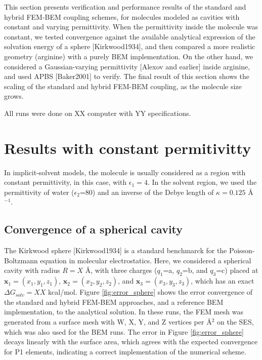 This section presents verification and performance results of the standard and hybrid FEM-BEM coupling schemes, for molecules modeled as cavities with constant and varying permittivity.
When the permittivity inside the molecule was constant, we tested convergence against the available analytical expression of the solvation energy of a sphere [Kirkwood1934], and then compared a more realistic geometry (arginine) with a purely BEM implementation.
On the other hand, we considered a Gaussian-varying permittivity [Alexov and earlier] inside arginine, and used APBS [Baker2001] to verify.
The final result of this section shows the scaling of the standard and hybrid FEM-BEM coupling, as the molecule size grows. 

All runs were done on XX computer with YY specifications. 

\section*{\sffamily \Large Results with constant permitivitty}

In implicit-solvent models, the molecule is usually considered as a region with constant permittivity, in this case, with $\epsilon_1=4$.
In the solvent region, we used the permittivity of water ($\epsilon_2$=80) and an inverse of the Debye length of $\kappa=0.125$ \AA$^{-1}$.

\subsection*{\sffamily \large Convergence of a spherical cavity}

The Kirkwood sphere [Kirkwood1934] is a standard benchmarck for the Poisson-Boltzmann equation in molecular electrostatics. 
Here, we considered a spherical cavity with radius $R=X$ \AA, with three charges ($q_1$=a, $q_2$=b, and $q_3$=c) placed at $\mathbf{x}_1=(x_1,y_1,z_1)$, $\mathbf{x}_2=(x_2,y_2,z_2)$, and $\mathbf{x}_3=(x_3,y_3,z_3)$, which has an exact $\Delta G_{solv}=XX$ kcal/mol.
Figure \ref{fig:error_sphere} shows the error convergence of the standard and hybrid FEM-BEM approaches, and a reference BEM implementation, to the analytical solution. 
In these runs, the FEM mesh was generated from a surface mesh with W, X, Y, and Z vertices per \AA$^2$ on the SES, which was also used for the BEM runs. 
The error in Figure \ref{fig:error_sphere} decays linearly with the surface area, which agrees with the expected convergence for P1 elements, indicating a correct implementation of the numerical scheme. 

